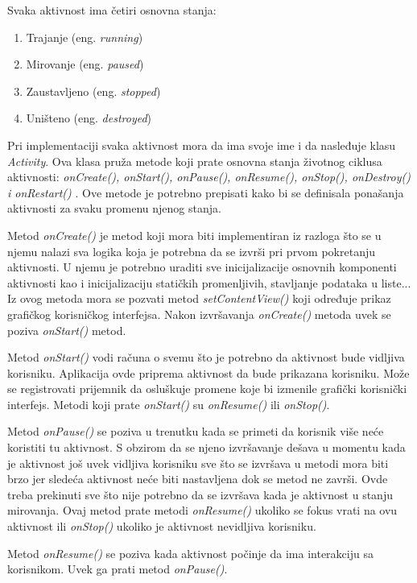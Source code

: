 \documentclass[android.tex]{subfiles}
\begin{document}
Svaka aktivnost ima četiri osnovna stanja: 
\begin{enumerate}
    \item Trajanje (eng. \textit{running})
    \item Mirovanje (eng. \textit{paused})
    \item Zaustavljeno (eng. \textit{stopped})
    \item Uništeno (eng. \textit{destroyed})
\end{enumerate}
Pri implementaciji svaka aktivnost mora da ima svoje ime i da nasleđuje klasu \textit{Activity}. Ova klasa pruža metode koji prate osnovna stanja životnog ciklusa aktivnosti: \textit{onCreate(), onStart(), onPause(), onResume(), onStop(), onDestroy() i onRestart()} \cite{book:and9cookbook}. Ove metode je potrebno prepisati kako bi se definisala ponašanja aktivnosti za svaku promenu njenog stanja. 

Metod \textit{onCreate()} je metod koji mora biti implementiran iz razloga što se u njemu nalazi sva logika koja je potrebna da se izvrši pri prvom pokretanju aktivnosti. U njemu je potrebno uraditi sve inicijalizacije osnovnih komponenti aktivnosti kao i inicijalizaciju statičkih promenljivih, stavljanje podataka u liste... Iz ovog metoda mora se pozvati metod \textit{setContentView()} koji određuje prikaz grafičkog korisničkog interfejsa. Nakon izvršavanja \textit{onCreate() }metoda uvek se poziva \textit{onStart()} metod.

Metod \textit{onStart() }vodi računa o svemu što je potrebno da aktivnost bude vidljiva korisniku. Aplikacija ovde priprema aktivnost da bude prikazana korisniku. Može se registrovati prijemnik da osluškuje promene koje bi izmenile grafički korisnički interfejs. Metodi koji prate \textit{onStart()} su \textit{onResume() }ili \textit{onStop()}.

Metod \textit{onPause()} se poziva u trenutku kada se primeti da korisnik više neće koristiti tu aktivnost. S obzirom da se njeno izvršavanje dešava u momentu kada je aktivnost još uvek vidljiva korisniku sve što se izvršava u metodi mora biti brzo jer sledeća aktivnost neće biti nastavljena dok se metod ne završi. Ovde treba prekinuti sve što nije potrebno da se izvršava kada je aktivnost u stanju mirovanja. Ovaj metod prate metodi \textit{onResume() }ukoliko se fokus vrati na ovu aktivnost ili \textit{onStop() }ukoliko je aktivnost nevidljiva korisniku.

Metod \textit{onResume()} se poziva kada aktivnost počinje da ima interakciju sa korisnikom. Uvek ga prati metod \textit{onPause()}.
\end{document}
